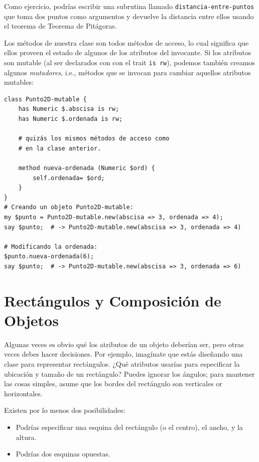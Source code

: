 Como ejercicio, podrías escribir una subrutina llamado 
\verb|distancia-entre-puntos| que toma dos puntos
como argumentos y devuelve la distancia entre ellos 
usando el teorema de Teorema de Pitágoras.

Los métodos de nuestra clase son todos métodos de acceso,
lo cual significa que ellos proveen el estado de algunos de los atributos
del invocante. Si los atributos son mutable (al ser declarados con
con el trait \verb|is rw|), podemos también creamos algunos \emph{mutadores},
i.e., métodos que se invocan para cambiar aquellos atributos mutables:

\begin{verbatim}
class Punto2D-mutable {
    has Numeric $.abscisa is rw;
    has Numeric $.ordenada is rw;
    
    # quizás los mismos métodos de acceso como
    # en la clase anterior.
    
    method nueva-ordenada (Numeric $ord) {
        self.ordenada= $ord; 
    }
}
# Creando un objeto Punto2D-mutable:
my $punto = Punto2D-mutable.new(abscisa => 3, ordenada => 4);
say $punto;  # -> Punto2D-mutable.new(abscisa => 3, ordenada => 4)

# Modificando la ordenada:
$punto.nueva-ordenada(6);
say $punto;  # -> Punto2D-mutable.new(abscisa => 3, ordenada => 6)
\end{verbatim}




\section{Rectángulos y Composición de Objetos}
\label{rectangles}

Algunas veces es obvio qué los atributos de un objeto deberían ser,
pero otras veces debes hacer decisiones. Por ejemplo, imagínate que estás
diseñando una clase para representar rectángulos. ¿Qué atributos usarías para
especificar la ubicación y tamaño de un rectángulo? Puedes ignorar 
los ángulos; para mantener las cosas simples, asume que los bordes 
del rectángulo son verticales or horizontales.

Existen por lo menos dos posibilidades:

\begin{itemize}

\item Podrías especificar una esquina del rectángulo (o el centro), 
el ancho, y la altura.

\item Podrías dos esquinas opuestas.

\end{itemize}

